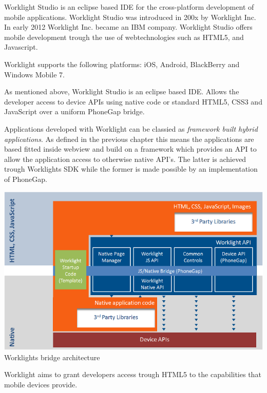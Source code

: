 



Worklight Studio is an eclipse based IDE for the cross-platform development of mobile applications. Worklight Studio was introduced in 200x by Worklight Inc. In early 2012 Worklight Inc. became an IBM company. Worklight Studio offers mobile development trough the use of webtechnologies such as HTML5, and Javascript.

Worklight supports the following platforms: iOS, Android, BlackBerry and Windows Mobile 7.

As mentioned above, Worklight Studio is an eclipse based IDE.
Allows the developer access to device APIs using native code or standard HTML5, CSS3 and JavaScript over a uniform PhoneGap bridge.


Applications developed with Worklight can be classied as \emph{framework built hybrid applications}. As defined in the previous chapter this means the applications are based fitted inside webview and build on a framework which provides an API to allow the application access to otherwise native API's. The latter is achieved trough Worklights SDK while the former is made possible by an implementation of PhoneGap. \cite{Inc2012}

\begin{centering}
	\includegraphics[scale=0.5]{images/Worklight_architecture.png}\\{Worklights bridge architecture\cite{Inc2012a}}\\
\end{centering}

Worklight aims to grant developers access trough HTML5 to the capabilities that mobile devices provide. 


